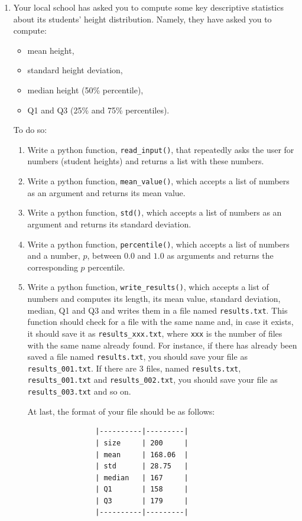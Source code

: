 \documentclass[a4paper, 11pt]{article}
\theoremstyle{definition}
\begin{document}
\begin{enumerate}[label = E\arabic*.]
\begin{enumerate}
		\end{enumerate}
		\item Your local school has asked you to compute some key descriptive statistics about its students' height distribution. Namely, they have asked you to compute:
		\begin{itemize}
			\item mean height,
			\item standard height deviation,
			\item median height (50\% percentile),
			\item Q1 and Q3 (25\% and 75\% percentiles).
		\end{itemize}
		To do so:
		\begin{enumerate}
			\item Write a python function, \texttt{read\_input()}, that repeatedly asks the user for numbers (student heights) and returns a list with these numbers.
			\item Write a python function, \texttt{mean\_value()}, which accepts a list of numbers as an argument and returns its mean value.
			\item Write a python function, \texttt{std()}, which accepts a list of numbers as an argument and returns its standard deviation.
			\item Write a python function, \texttt{percentile()}, which accepts a list of numbers and a number, $p$, between $0.0$ and $1.0$ as arguments and returns the corresponding $p$ percentile.
			\item Write a python function, \texttt{write\_results()}, which accepts a list of numbers and computes its length, its mean value, standard deviation, median, Q1 and Q3 and writes them in a file named \texttt{results.txt}. This function should check for a file with the same name and, in case it exists, it should save it as \texttt{results\_xxx.txt}, where \texttt{xxx} is the number of files with the same name already found. For instance, if there has already been saved a file named \texttt{results.txt}, you should save your file as \texttt{results\_001.txt}. If there are 3 files, named \texttt{results.txt}, \texttt{results\_001.txt} and \texttt{results\_002.txt}, you should save your file as \texttt{results\_003.txt} and so on.
			
			At last, the format of your file should be as follows:
			\begin{verbatim}
				|----------|---------|
				| size     | 200     |
				| mean     | 168.06  |
				| std      | 28.75   |
				| median   | 167     |
				| Q1       | 158     |
				| Q3       | 179     |
				|----------|---------|
			\end{verbatim}
			

\end{enumerate}
\end{enumerate}
\end{document}
